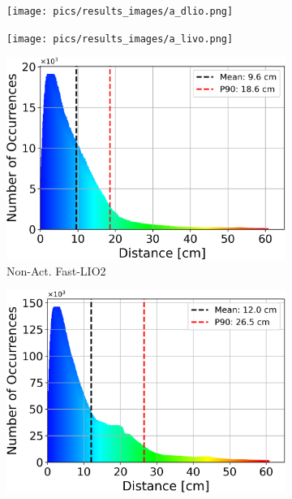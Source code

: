 \documentclass[conference]{IEEEtran}
\begin{document}
\begin{figure}[htbp]
\begin{subfigure}{0.195\textwidth}
    \label{fig:results_act_lio}
\end{subfigure}
\begin{subfigure}{0.195\textwidth}
    \centering
    \texttt{[image: pics/results\_images/a\_dlio.png]}
    \label{fig:results_act_dlio}
\end{subfigure}
\begin{subfigure}{0.195\textwidth}
    \centering
    \texttt{[image: pics/results\_images/a\_livo.png]}
    \label{fig:results_act_livo}
\end{subfigure}

\begin{subfigure}{0.18\textwidth}
    \centering
    \includegraphics[width=\textwidth]{pics/histogram_results/histogram_cond_non_actuated_lio.png}
    \caption{Non-Act. Fast-LIO2}
    \label{fig:hist_non_lio}
\end{subfigure}
\hfill
\begin{subfigure}{0.18\textwidth}
    \centering
    \includegraphics[width=\textwidth]{pics/histogram_results/histogram_cond_non_actuated_livo.png}

\end{subfigure}
\end{figure}
\end{document}
